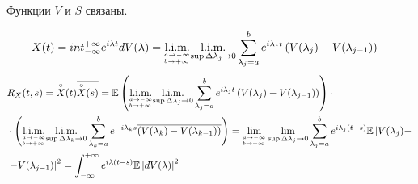 \begin{Note}
    Функции $V$ и $S$ связаны.
\end{Note}
\begin{align*}
  & X(t) = int_{-\infty}^{+\infty}e^{i\lambda t} dV(\lambda) = \underset{^{a \to -\infty}_{b \to +\infty}}{\text{l}.\text{i}.\text{m}.} \underset{\sup \Delta \lambda_j \to 0}{\text{l}.\text{i}.\text{m}.}\sum_{\lambda_j=a}^be^{i\lambda_jt}\left( V(\lambda_j) - V(\lambda_{j-1}) \right)
\end{align*}
\begin{align*}
  & R_X(t,s) = \overset{\circ}{X}(t)\overline{\overset{\circ}{X}(s)} = \mathbb{E} \left( \underset{^{a \to -\infty}_{b \to +\infty}}{\text{l}.\text{i}.\text{m}.}\underset{\sup \Delta \lambda_j \to 0}{\text{l}.\text{i}.\text{m}.} \sum_{\lambda_j=a}^be^{i\lambda_jt}\left( V(\lambda_j) - V(\lambda_{j-1}) \right)\right)\cdot \\
  & \cdot \left( \underset{^{a \to -\infty}_{b \to +\infty}}{\text{l}.\text{i}.\text{m}.}\underset{\sup \Delta \lambda_k \to 0}{\text{l}.\text{i}.\text{m}.} \sum_{\lambda_k=a}^be^{-i\lambda_ks}\overline{\left( V(\lambda_k) - V(\lambda_{k-1}) \right)}\right) = \lim_{^{a \to -\infty}_{b \to +\infty}}\lim_{\sup \Delta \lambda_j \to 0} \sum_{\lambda_j=a}^be^{i\lambda_j(t-s)}\mathbb{E} \left| V(\lambda_j) - \right. \\
  & \left. - V(\lambda_{j-1}) \right|^2 = \int_{-\infty}^{+\infty} e^{i\lambda(t-s)}\mathbb{E} \left| dV(\lambda) \right|^2
\end{align*}
